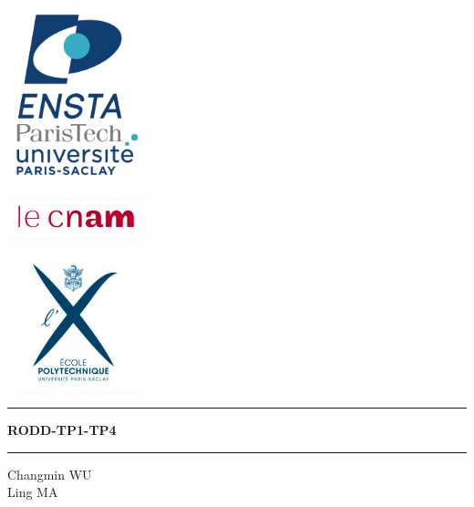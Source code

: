 \documentclass[12pt,a4paper]{article}
\begin{document}
\setcounter{page}{0}


\begin{center}

\begin{minipage}[l]{.2\linewidth}
	\flushleft\includegraphics[width=4cm]{img/logo_ENSTA.png}
\end{minipage}
\begin{minipage}[r]{.35\linewidth}
	\flushright\includegraphics[width=4cm]{img/logo_CNAM.png}
\end{minipage}
\begin{minipage}[r]{.3\linewidth}
	\flushright\includegraphics[width=4cm]{img/logo_X.jpg}
\end{minipage}
\vspace{1.5cm}

\hrule \vspace{0.5cm}
\begin{LARGE}
	\textbf{RODD-TP1-TP4}\\
\end{LARGE}
\vspace{0.5cm} \hrule
\vspace{3cm}

\begin{Large}\color{carmine}
	Changmin WU\\
	Ling MA\\
\end{Large}
\vspace{5cm}


\end{center}
\end{document}
